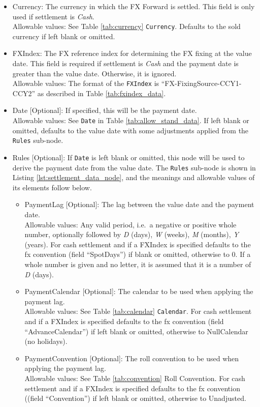 \begin{itemize}
\item Currency: The currency in which the FX Forward is settled. This field is only used if settlement is \emph{Cash}. \\
Allowable values:  See Table \ref{tab:currency} \lstinline!Currency!. Defaults to the sold currency if left blank or omitted.
\item FXIndex: The FX reference index for determining the FX fixing at the value date. This field is required if settlement is \emph{Cash}
and the payment date is greater than the value date. Otherwise, it is ignored. \\
Allowable values: The format of the \lstinline!FXIndex! is ``FX-FixingSource-CCY1-CCY2'' as described in Table \ref{tab:fxindex_data}.
\item Date [Optional]: If specified, this will be the payment date. \\
Allowable values: See \lstinline!Date! in Table \ref{tab:allow_stand_data}. If left blank or omitted, defaults to the value date with some adjustments applied
from the \lstinline!Rules! sub-node.
\item Rules [Optional]: If \lstinline!Date! is left blank or omitted, this node will be used to derive the payment date from the value date.
The \lstinline!Rules! sub-node is shown in Listing \ref{lst:settlement_data_node}, and the meanings and allowable values of its elements follow below.
  \begin{itemize}
	\item PaymentLag [Optional]: The lag between the value date and the payment date. \\
	Allowable values: Any valid period, i.e.\ a negative or positive whole number, optionally followed by \emph{D} (days), \emph{W} (weeks), \emph{M} (months),
  \emph{Y} (years). For cash settlement and if a FXIndex is specified defaults to the fx convention (field ``SpotDays'') if blank or omitted, otherwise to 0. If a whole number is given and no letter, it is assumed that it is a number of  \emph{D} (days).
	\item PaymentCalendar [Optional]: The calendar to be used when applying the payment lag. \\
	Allowable values: See Table \ref{tab:calendar} \lstinline!Calendar!. For cash settlement and if a FXIndex is specified defaults to the fx convention (field ``AdvanceCalendar'') if left blank or omitted, otherwise to NullCalendar (no holidays).
	\item PaymentConvention [Optional]: The roll convention to be used when applying the payment lag. \\
	Allowable values: See Table \ref{tab:convention} Roll Convention. For cash settlement and if a FXIndex is specified defaults to the fx convention ((field ``Convention'') if left blank or omitted, otherwise to Unadjusted.
  \end{itemize}
\end{itemize}

